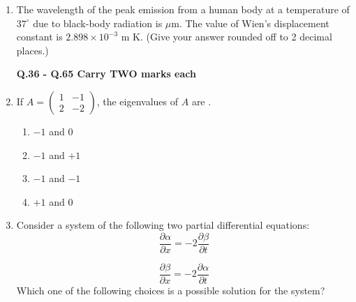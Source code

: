 \documentclass[a4paper,12pt]{exam}
\numberwithin{equation}{enumi}
\numberwithin{figure}{enumi}
\begin{document}
\begin{enumerate}
\item The wavelength of the peak emission from a human body at a temperature of $37^\circ$  due to black-body radiation is \underline{\hspace{1cm}} $\mu$m. The value of Wien’s displacement  constant is $2.898 \times 10^{-3}$ m K. (Give your answer rounded off to 2 decimal places.)

\hfill{}

\textbf{Q.36 - Q.65 Carry TWO marks each}

\vspace{0.25cm}

\item If $A = \begin{pmatrix} 1 & -1 \\ 2 & -2 \end{pmatrix}$, the eigenvalues of $A$ are \underline{\hspace{2cm}}.

\hfill{}

\begin{multicols}{4}
\begin{enumerate}
\item $-1$ and 0
\item $-1$ and $+1$
\item $-1$ and $-1$
\item $+1$ and 0
\end{enumerate}
\end{multicols}

\item Consider a system of the following two partial differential equations: \\

\begin{equation*}
\displaystyle\frac{\partial\alpha}{\partial x} = -2\frac{\partial\beta}{\partial t}  
\end{equation*}

\vspace{8pt}

\begin{equation*}
\displaystyle\frac{\partial\beta}{\partial x} = -2\frac{\partial\alpha}{\partial t}
\end{equation*}
Which one of the following choices is a possible solution for the system? 

\hfill{}


\end{enumerate}
\end{document}
